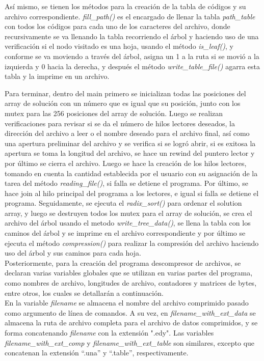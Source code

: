 \documentclass[12pt, article, natbib]{IEEEtran}
\begin{document}
Así mismo, se tienen los métodos para la creación de la tabla de códigos y su archivo correspondiente. \textit{fill\_path()} es el encargado de llenar la tabla \textit{path\_table} con todos los códigos para cada uno de los caracteres del archivo, donde recursivamente se va llenando la tabla recorriendo el árbol y haciendo uso de una verificación si el nodo visitado es una hoja, usando el método \textit{is\_leaf()}, y conforme se va moviendo a través del árbol, asigna un 1 a la ruta si se movió a la izquierda y 0 hacia la derecha, y después el método \textit{write\_table\_file()} agarra esta tabla y la imprime en un archivo.

Para terminar, dentro del main primero se inicializan todas las posiciones del array de solución con un número que es igual que su posición, junto con los mutex para las 256 posiciones del array de solución. Luego se realizan verificaciones para revisar si se da el número de hilos lectores deseados, la dirección del archivo a leer o el nombre deseado para el archivo final, así como una apertura preliminar del archivo y se verifica si se logró abrir, si es exitosa la apertura se toma la longitud del archivo, se hace un rewind del puntero lector y por último se cierra el archivo. Luego se hace la creación de los hilos lectores, tomando en cuenta la cantidad establecida por el usuario con su asignación de la tarea del método \textit{reading\_file()}, si falla se detiene el programa. Por último, se hace join al hilo principal del programa a los lectores, e igual si falla se detiene el programa.\cite{kerrisk_2010_pthread_join3} Seguidamente, se ejecuta el \textit{radix\_sort()} para ordenar el solution array, y luego se destruyen todos los mutex para el array de solución, se crea el archivo del árbol usando el metodo \textit{write\_tree\_data()}, se llena la tabla con los caminos del árbol y se imprime en el archivo correspondiente y por último se ejecuta el método \textit{compression()} para realizar la compresión del archivo haciendo uso del árbol y sus caminos para cada hoja.\\

Posteriormente, para la creación del programa descompresor de archivos, se declaran varias variables globales que se utilizan en varias partes del programa, como nombres de archivo, longitudes de archivo, contadores y matrices de bytes, entre otros, los cuales se detallarán a continuación.\\

En la variable \textit{filename} se almacena el nombre del archivo comprimido pasado como argumento de línea de comandos. A su vez, en \textit{filename\_with\_ext\_data} se almacena la ruta de archivo completa para el archivo de datos comprimidos, y se forma concatenando \textit{filename} con la extensión ".edy". Las variables \textit{ filename\_with\_ext\_comp} y \textit{ filename\_with\_ext\_table} son similares, excepto que concatenan la extensión “.una” y “.table”, respectivamente.
\end{document}
